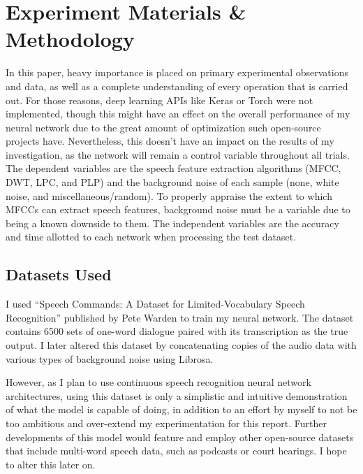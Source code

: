 
\chapter{Experiment Materials \& Methodology} %

\label{ExperimentMaterialsMethodology} %

In this paper, heavy importance is placed on primary experimental observations and data, as well as a complete understanding of every operation that is carried out. For those reasons, deep learning APIs like Keras or Torch were not implemented, though this might have an effect on the overall performance of my neural network due to the great amount of optimization such open-source projects have. Nevertheless, this doesn’t have an impact on the results of my investigation, as the network will remain a control variable throughout all trials. The dependent variables are the speech feature extraction algorithms (MFCC, DWT, LPC, and PLP) and the background noise of each sample (none, white noise, and miscellaneous/random). To properly appraise the extent to which MFCCs can extract speech features, background noise must be a variable due to being a known downside to them. The independent variables are the accuracy and time allotted to each network when processing the test dataset. 


\section{Datasets Used}

I used “Speech Commands: A Dataset for Limited-Vocabulary Speech Recognition” published by Pete Warden to train my neural network. The dataset contains 6500 sets of one-word dialogue paired with its transcription as the true output. I later altered this dataset by concatenating copies of the audio data with various types of background noise using Librosa.
\par
However, as I plan to use continuous speech recognition neural network architectures, using this dataset is only a simplistic and intuitive demonstration of what the model is capable of doing, in addition to an effort by myself to not be too ambitious and over-extend my experimentation for this report. Further developments of this model would feature and employ other open-source datasets that include multi-word speech data, such as podcasts or court hearings. I hope to alter this later on.


